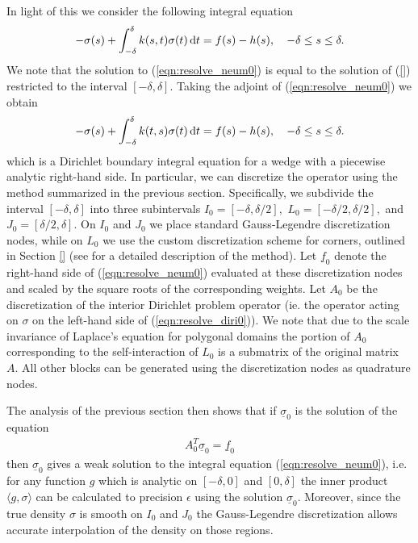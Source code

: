 In light of this we consider the following integral equation
\begin{align}\label{eqn:resolve_neum0}
-\sigma(s) + \int_{-\delta}^\delta k(s,t) \sigma(t)\,{\rm d}t = f(s)-h(s), \quad -\delta \le s \le \delta.
\end{align}
We note that the solution to (\ref{eqn:resolve_neum0}) is equal to the solution of (\ref{}) restricted to the interval $[-\delta,\delta].$ Taking the adjoint of (\ref{eqn:resolve_neum0}) we obtain
\begin{align}\label{eqn:resolve_diri0}
-\sigma(s) + \int_{-\delta}^\delta k(t,s) \sigma(t)\,{\rm d}t = f(s)-h(s), \quad -\delta \le s \le \delta.
\end{align}
which is a Dirichlet boundary integral equation for a wedge with a piecewise analytic right-hand side. In particular, we can discretize the operator using the method summarized in the previous section. Specifically, we subdivide the interval $[-\delta,\delta]$ into three subintervals $I_0 = [-\delta,\delta/2],$ $L_0 = [-\delta/2,\delta/2],$ and $J_0 = [\delta/2,\delta].$ On $I_0$ and $J_0$ we place standard Gauss-Legendre discretization nodes, while on $L_0$ we use the custom discretization scheme for corners, outlined in Section \ref{} (see \cite{} for a detailed description of the method). Let $\underline{f}_0$ denote the right-hand side of (\ref{eqn:resolve_neum0}) evaluated at these discretization nodes and scaled by the square roots of the corresponding weights. Let $A_0$ be the discretization of the interior Dirichlet problem operator (ie. the operator acting on $\sigma$ on the left-hand side of (\ref{eqn:resolve_diri0})). We note that due to the scale invariance of Laplace's equation for polygonal domains the portion of $A_0$ corresponding to the self-interaction of $L_0$ is a submatrix of the original matrix $A.$ All other blocks can be generated using the discretization nodes as quadrature nodes.

The analysis of the previous section then shows that if $\underline{\sigma}_0$ is the solution of the equation
\begin{align}
A_0^T \underline{\sigma}_0 = \underline{f}_0
\end{align}
then $\underline{\sigma}_0$ gives a {\color{red}weak solution} to the integral equation (\ref{eqn:resolve_neum0}), i.e. for any function $g$ which is analytic on $[-\delta,0]$ and $[0,\delta]$ the inner product $\langle g,\sigma \rangle$ can be calculated to precision $\epsilon$ using the solution $\underline{\sigma}_0.$ Moreover, since the true density $\sigma$ is smooth on $I_0$ and $J_0$ the Gauss-Legendre discretization allows accurate interpolation of the density on those regions.

